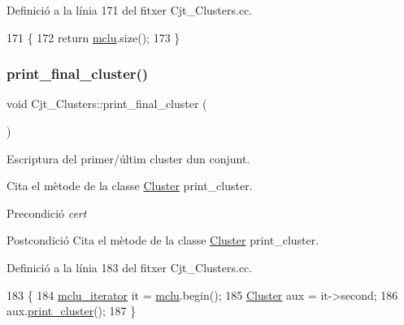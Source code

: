 Definició a la línia 171 del fitxer Cjt\+\_\+\+Clusters.\+cc.


\begin{DoxyCode}
171                                          \{
172     \textcolor{keywordflow}{return} \hyperlink{class_cjt___clusters_a5f5e13255bca1fac2ad65c51473f6ead}{mclu}.size();
173 \}
\end{DoxyCode}
\mbox{\label{class_cjt___clusters_af0dffae314624bb0ab6f6c7f8e28a770}} 
\subsubsection{\texorpdfstring{print\+\_\+final\+\_\+cluster()}{print\_final\_cluster()}}
{\footnotesize\ttfamily void Cjt\+\_\+\+Clusters\+::print\+\_\+final\+\_\+cluster (\begin{DoxyParamCaption}{ }\end{DoxyParamCaption})}



Escriptura del primer/últim cluster d\textquotesingle{}un conjunt. 

Cita el mètode de la classe \hyperlink{class_cluster}{Cluster} print\+\_\+cluster.

\begin{DoxyPrecond}{Precondició}
{\itshape cert} 
\end{DoxyPrecond}
\begin{DoxyPostcond}{Postcondició}
Cita el mètode de la classe \hyperlink{class_cluster}{Cluster} print\+\_\+cluster. 
\end{DoxyPostcond}


Definició a la línia 183 del fitxer Cjt\+\_\+\+Clusters.\+cc.


\begin{DoxyCode}
183                                        \{
184     \hyperlink{class_cjt___clusters_ad9cf46a8e1e6430c7b34b184f2756054}{mclu\_iterator} it = \hyperlink{class_cjt___clusters_a5f5e13255bca1fac2ad65c51473f6ead}{mclu}.begin();
185     \hyperlink{class_cluster}{Cluster} aux = it->second;
186     aux.\hyperlink{class_cluster_ad4607d22299a7b2b2cc271300166da47}{print\_cluster}();
187 \}
\end{DoxyCode}
\mbox{\label{class_cjt___clusters_a0072a1e21a58e0ab64ac96ccff068229}} 
